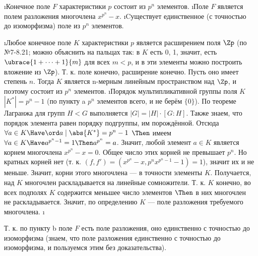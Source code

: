 \begin{problem}
\begin{enumerate}
\def\labelenumi{\alph{enumi})}
\i Конечное поле $F$ характеристики $p$ состоит из $p^n$ элементов. 
\i Поле $F$ является полем разложения многочлена $x^{p^n}-x$. 
\i Cуществует единственное (с точностью до изоморфизма) поле из $p^n$ элементов.
\end{enumerate}
\end{problem}
\begin{solution}
\begin{enumerate}
\def\labelenumi{\alph{enumi})}
\i Любое конечное поле \(K\) характеристики $p$ является расширением поля \(\Zp\) (по №7-8.21; можно объяснить на пальцах так: в $K$ есть 0, 1, значит, есть $\ubrace{1+\dots+1}{m}$ для всех $m<p$, и в эти элементы можно построить вложение из $\Zp$). Т. к. поле конечно, расширение конечно. Пусть оно имеет степень $n$. Тогда \(K\) является n-мерным линейным пространством над \(\Zp\), и поэтому состоит из \(p^n\) элементов.
\i Порядок мультипликативной группы поля $K$ $|K^*|=p^n-1$ (по пункту a $p^n$ элементов всего, и не берём $\{0\}$). По теореме Лагранжа для групп $H < G$ выполняется $|G| = |H| \cdot [G:H]$. Также знаем, что порядок элемента равен порядку подгруппы, им порождённой. Отсюда $\forall a \in K \Have \ord a \mid \abs{K^*}=p^n-1$ $\Then$ имеем $\forall a \in K \Have a^{p^n-1}=1 \Then a^{p^n}=a$. Значит, любой элемент $a \in K$ является корнем многочлена $x^{p^n}-x=0$. Общее число этих корней не превышает $p^n$. Но кратных корней нет (т. к. $(f, f') = (x^{p^n}-x, p^nx^{p^n-1}-1) = 1$), значит их и не меньше. Значит, корни этого многочлена --- в точности элементы $K$. Получается, над $K$ многочлен раскладывается на линейные сомножители. Т. к. $K$ конечно, во всех подполях $K$ содержится меньшее число элементов $\Then$ в них многочлен не раскладывается. Значит, по определению $K$ --- поле разложения требуемого многочлена.
\i 
	
	Т. к. по пункту b поле $F$ есть поле разложения, оно единственно с точностью до изоморфизма (знаем, что поле разложения единственно с точностью до изоморфизма, и пользуемся этим без доказательства).
\end{enumerate}
\end{solution}

